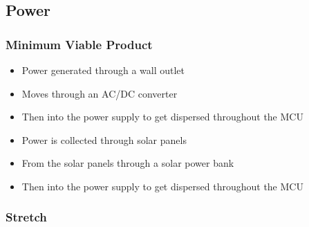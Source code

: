 \subsection{Power}
\subsubsection{Minimum Viable Product}
\begin{itemize}
  \item Power generated through a wall outlet
  \item Moves through an AC/DC converter 
  \item Then into the power supply to get dispersed throughout the MCU 
  \item Power is collected through solar panels
  \item From the solar panels through a solar power bank 
  \item Then into the power supply to get dispersed throughout the MCU
\end{itemize}
\subsubsection{Stretch}
